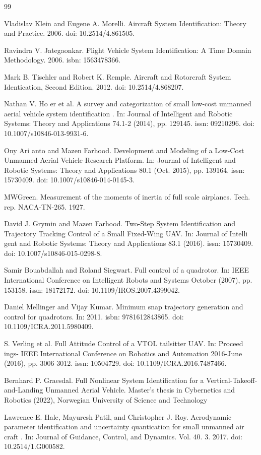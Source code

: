 \documentclass[letterpaper, 10 pt, conference]{ieeeconf}
\begin{document}
\begin{thebibliography}{99}

 Vladislav Klein and Eugene A. Morelli. Aircraft System Identification: Theory and Practice. 2006. doi: 10.2514/4.861505.

 Ravindra V. Jategaonkar. Flight Vehicle System Identification: A Time Domain Methodology. 2006. isbn: 1563478366.

 Mark B. Tischler and Robert K. Remple. Aircraft and Rotorcraft System Identication, Second Edition. 2012. doi: 10.2514/4.868207.

 Nathan V. Ho er et al. A survey and categorization of small low-cost unmanned aerial vehicle system identification . In: Journal of Intelligent and Robotic Systems: Theory and Applications 74.1-2 (2014), pp. 129145. issn: 09210296. doi: 10.1007/s10846-013-9931-6.

 Ony Ari anto and Mazen Farhood. Development and Modeling of a Low-Cost Unmanned Aerial Vehicle Research Platform. In: Journal of Intelligent and Robotic Systems: Theory and Applications 80.1 (Oct. 2015), pp. 139164. issn: 15730409. doi: 10.1007/s10846-014-0145-3.

 MWGreen. Measurement of the moments of inertia of full scale airplanes. Tech. rep. NACA-TN-265. 1927.

 David J. Grymin and Mazen Farhood. Two-Step System Identification and Trajectory Tracking Control of a Small Fixed-Wing UAV. In: Journal of Intelli gent and Robotic Systems: Theory and Applications 83.1 (2016). issn: 15730409. doi: 10.1007/s10846-015-0298-8.

 Samir Bouabdallah and Roland Siegwart. Full control of a quadrotor. In: IEEE International Conference on Intelligent Robots and Systems October (2007), pp. 153158. issn: 18172172. doi: 10.1109/\allowbreak IROS.2007.4399042.

 Daniel Mellinger and Vijay Kumar. Minimum snap trajectory generation and control for quadrotors. In: 2011. isbn: 9781612843865. doi: 10.1109/\allowbreak ICRA.2011.5980409.

 S. Verling et al. Full Attitude Control of a VTOL tailsitter UAV. In: Proceed ings- IEEE International Conference on Robotics and Automation 2016-June (2016), pp. 3006 3012. issn: 10504729. doi: 10.1109/ICRA.2016.7487466.

 Bernhard P. Graesdal. Full Nonlinear System Identification for a Vertical-Takeoff-and-Landing Unmanned Aerial Vehicle.  Master’s thesis in Cybernetics and Robotics (2022), Norwegian University of Science and Technology

 Lawrence E. Hale, Mayuresh Patil, and Christopher J. Roy. Aerodynamic parameter identification and uncertainty quantication for small unmanned air craft . In: Journal of Guidance, Control, and Dynamics. Vol. 40. 3. 2017. doi: 10.2514/1.G000582.

\end{thebibliography}
\end{document}
